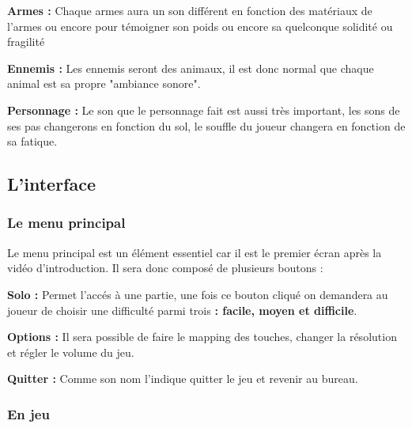 \documentclass{article}
\begin{document}
\par
\textbf{Armes :} Chaque armes aura un son différent en fonction des matériaux de l'armes ou encore pour témoigner son poids ou encore sa quelconque solidité ou fragilité 
\newline

\par
\textbf{Ennemis :} Les ennemis seront des animaux, il est donc normal que chaque animal est sa propre "ambiance sonore".
\newline

\par
\textbf{Personnage :} Le son que le personnage fait est aussi très important, les sons de ses pas changerons en fonction du sol, le souffle du joueur changera en fonction de sa fatique.
\newline

\subsection{L'interface}

\subsubsection{Le menu principal}

\par
Le menu principal est un élément essentiel car il est le premier écran après la vidéo d'introduction. Il sera donc composé de plusieurs boutons :
\newline

\par
\textbf{Solo :} Permet l'accés à une partie, une fois ce bouton cliqué on demandera au joueur de choisir une difficulté parmi trois \textbf{: facile, moyen et difficile}.
\newline

\par
\textbf{Options :} Il sera possible de faire le mapping des touches, changer la résolution et régler le volume du jeu.
\newline

\par
\textbf{Quitter :} Comme son nom l'indique quitter le jeu et revenir au bureau.
\newline

\subsubsection{En jeu}
\end{document}
